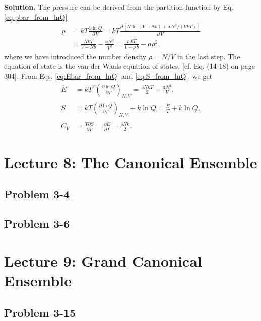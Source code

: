 \documentclass[twocolumn, 10pt]{article}
\numberwithin{equation}{section}
\newenvironment{solution}
{\par\medskip
  \textbf{Solution. }\ignorespaces}
{\medskip}
\begin{document}
\begin{solution}
The pressure can be derived from the partition function
by Eq. \eqref{eq:pbar_from_lnQ}
%
\begin{align*}
p &=
  kT \frac{ \partial \ln Q } { \partial \, V }
=
  kT \frac{ \partial \, [ N \ln (V - N b)
   + a \, N^2 / (V k T)] }
  { \partial \, V }
\\
&=
  \frac{ N k T } { V - N b} - \frac{ a N^2 }{ V^2 }
=
  \frac{ \rho \, k T } { 1 - \rho \, b} - a \rho^2
,
\end{align*}
%
where we have introduced
the number density $\rho = N/V$ in the last step.
%
The equation of state is the van der Waals equation of states,
  [cf. Eq. (14-18) on page 304].
%
From Eqs. \eqref{eq:Ebar_from_lnQ} and \eqref{eq:S_from_lnQ},
we get
\begin{align*}
\overline E
&=
    kT^2 \left(
      \frac{ \partial \ln Q }
           { \partial T }
    \right)_{N, V}
=
  \frac{ 3 N k T }{2}
  -\frac{ a N^2 } { V}
,
\\
S
&=
    kT \left(
      \frac{ \partial \ln Q }
           { \partial T }
    \right)_{N, V}
    + k \ln Q
=
  \frac{ \overline E } { T }
  + k \ln Q
,
\\
C_V
&=
\frac{ T \partial S } { \partial T }
=
\frac{ \partial \overline E } { \partial T }
= \frac{ 3 N k}{2}
.
\end{align*}
\end{solution}

\section{Lecture 8: The Canonical Ensemble}

\subsection{Problem 3-4}

\subsection{Problem 3-6}

\section{Lecture 9: Grand Canonical Ensemble}

\subsection{Problem 3-15}
\end{document}
